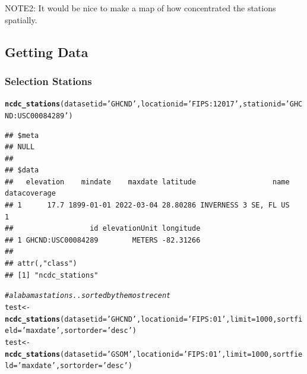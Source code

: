 \documentclass{article}\usepackage[]{graphicx}\usepackage[]{color}
\makeatletter
\newcommand{\hlnum}[1]{\textcolor[rgb]{0.686,0.059,0.569}{#1}}%
\newcommand{\hlstr}[1]{\textcolor[rgb]{0.192,0.494,0.8}{#1}}%
\newcommand{\hlcom}[1]{\textcolor[rgb]{0.678,0.584,0.686}{\textit{#1}}}%
\newcommand{\hlstd}[1]{\textcolor[rgb]{0.345,0.345,0.345}{#1}}%
\newcommand{\hlkwb}[1]{\textcolor[rgb]{0.69,0.353,0.396}{#1}}%
\newcommand{\hlkwc}[1]{\textcolor[rgb]{0.333,0.667,0.333}{#1}}%
\newcommand{\hlkwd}[1]{\textcolor[rgb]{0.737,0.353,0.396}{\textbf{#1}}}%
\newenvironment{kframe}{%
 \def\at@end@of@kframe{}%
 \ifinner\ifhmode%
  \def\at@end@of@kframe{\end{minipage}}%
  \begin{minipage}{\columnwidth}%
 \fi\fi%
 \def\FrameCommand##1{\hskip\@totalleftmargin \hskip-\fboxsep
 \colorbox{shadecolor}{##1}\hskip-\fboxsep
     \hskip-\linewidth \hskip-\@totalleftmargin \hskip\columnwidth}%
 \MakeFramed {\advance\hsize-\width
   \@totalleftmargin\z@ \linewidth\hsize
   \@setminipage}}%
 {\par\unskip\endMakeFramed%
 \at@end@of@kframe}
\newenvironment{knitrout}{}{} %
\makeatother
\begin{document}
NOTE2: It would be nice to make a map of how concentrated the stations spatially. 

\subsection{Getting Data}

\subsubsection{Selection Stations}

\begin{knitrout}
\color{fgcolor}\begin{kframe}
\begin{alltt}
\hlkwd{ncdc_stations}\hlstd{(}\hlkwc{datasetid}\hlstd{=}\hlstr{'GHCND'}\hlstd{,} \hlkwc{locationid}\hlstd{=}\hlstr{'FIPS:12017'}\hlstd{,} \hlkwc{stationid}\hlstd{=}\hlstr{'GHCND:USC00084289'}\hlstd{)}
\end{alltt}
\begin{verbatim}
## $meta
## NULL
## 
## $data
##   elevation    mindate    maxdate latitude                  name datacoverage
## 1      17.7 1899-01-01 2022-03-04 28.80286 INVERNESS 3 SE, FL US            1
##                  id elevationUnit longitude
## 1 GHCND:USC00084289        METERS -82.31266
## 
## attr(,"class")
## [1] "ncdc_stations"
\end{verbatim}
\begin{alltt}
\hlcom{# alabama stations.. sorted by the most recent}
\hlstd{test} \hlkwb{<-} \hlkwd{ncdc_stations}\hlstd{(}\hlkwc{datasetid}\hlstd{=}\hlstr{'GHCND'}\hlstd{,} \hlkwc{locationid}\hlstd{=}\hlstr{'FIPS:01'}\hlstd{,} \hlkwc{limit}\hlstd{=}\hlnum{1000}\hlstd{,} \hlkwc{sortfield} \hlstd{=} \hlstr{'maxdate'}\hlstd{,} \hlkwc{sortorder}\hlstd{=}\hlstr{'desc'}\hlstd{)}
\hlstd{test} \hlkwb{<-} \hlkwd{ncdc_stations}\hlstd{(}\hlkwc{datasetid}\hlstd{=}\hlstr{'GSOM'}\hlstd{,} \hlkwc{locationid}\hlstd{=}\hlstr{'FIPS:01'}\hlstd{,} \hlkwc{limit}\hlstd{=}\hlnum{1000}\hlstd{,} \hlkwc{sortfield} \hlstd{=} \hlstr{'maxdate'}\hlstd{,} \hlkwc{sortorder}\hlstd{=}\hlstr{'desc'}\hlstd{)}


\end{alltt}
\end{kframe}
\end{knitrout}
\end{document}
